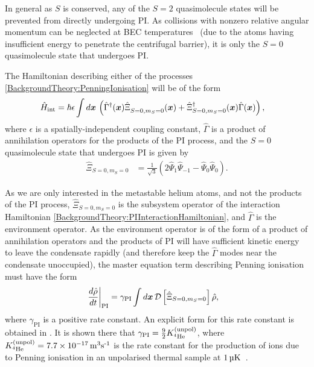 In general as $S$ is conserved, any of the $S=2$ quasimolecule states will be prevented from directly undergoing PI. As collisions with nonzero relative angular momentum can be neglected at BEC temperatures~\citep{Venturi:2000,Stas:2006kx} (due to the atoms having insufficient energy to penetrate the centrifugal barrier), it is only the $S=0$ quasimolecule state that undergoes PI.

The Hamiltonian describing either of the processes \eqref{BackgroundTheory:PenningIonisation} will be of the form
\begin{align}
    \hat{H}_\text{int} &= \hbar \epsilon \int d \vect{x}\, \left(\hat{\Gamma}^\dagger(\vect{x})\hat{\Xi}_{S=0, m_S=0}^{\phantom{\dagger}}(\vect{x}) + \hat{\Xi}_{S=0, m_S=0}^\dagger (\vect{x}) \hat{\Gamma}(\vect{x}) \right), \label{BackgroundTheory:PIInteractionHamiltonian}
\end{align}
where $\epsilon$ is a spatially-independent coupling constant, $\hat{\Gamma}$ is a product of annihilation operators for the products of the PI process, and the $S=0$ quasimolecule state that undergoes PI is given by
\begin{align}
    \hat{\Xi}_{S=0, m_S=0} &= \frac{1}{\sqrt{3}} \left( 2 \hat{\Psi}_1 \hat{\Psi}_{-1} - \hat{\Psi}_0 \hat{\Psi}_0\right).
\end{align}

As we are only interested in the metastable helium atoms, and not the products of the PI process, $\hat{\Xi}_{S=0, m_S=0}$ is the subsystem operator of the interaction Hamiltonian \eqref{BackgroundTheory:PIInteractionHamiltonian}, and $\hat{\Gamma}$ is the environment operator.  As the environment operator is of the form of a product of annihilation operators and the products of PI will have sufficient kinetic energy to leave the condensate rapidly (and therefore keep the $\hat{\Gamma}$ modes near the condensate unoccupied), the master equation term describing Penning ionisation must have the form
\begin{align}
    \left.\frac{d \hat{\rho}}{dt}\right|_\text{PI} &= \gamma_\text{PI} \int d \vect{x}\, \mathcal{D}\left[ \hat{\Xi}_{S=0, m_S=0}\right] \hat{\rho}, \label{BackgroundTheory:PenningIonisationMasterEquationTerm}
\end{align}
where $\gamma_\text{PI}$ is a positive rate constant.  An explicit form for this rate constant is obtained in .  It is shown there that $\gamma_\text{PI} = \frac{9}{2} K^\text{(unpol)}_{^4\text{He}}$, where $\Kunpol = \unit[7.7\times 10^{-17}]{m\textsuperscript{3}s\textsuperscript{-1}}$ is the rate constant for the production of ions due to Penning ionisation in an unpolarised thermal sample at $\unit[1]{\micro K}$~\citep{Stas:2006kx}.

